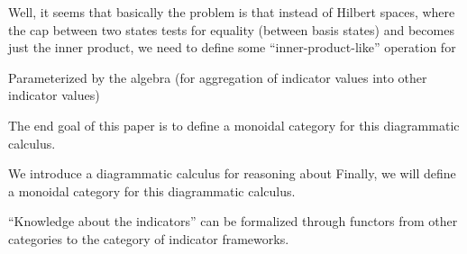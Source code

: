 \documentclass{sig-alternate-05-2015}
\theoremstyle{plain}
\theoremstyle{plain}
\theoremstyle{remark}
\begin{document}
Well, it seems that basically the problem is that instead of Hilbert spaces, where the cap between two states tests for equality (between basis states) and becomes just the inner product, we need to define some ``inner-product-like'' operation for 

Parameterized by the algebra (for aggregation of indicator values into other indicator values)

The end goal of this paper is to define a monoidal category for this diagrammatic calculus.

We introduce a diagrammatic calculus for reasoning about  Finally, we will define a monoidal category for this diagrammatic calculus.

``Knowledge about the indicators'' can be formalized through functors from other categories to the category of indicator frameworks.
\end{document}
